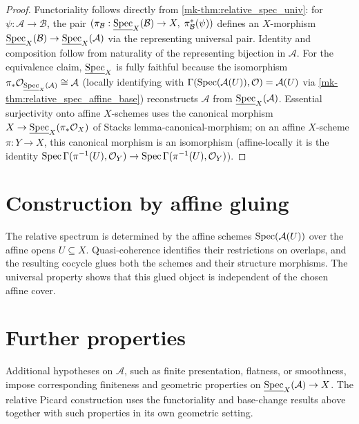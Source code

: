\begin{proof}
  Functoriality follows directly from \ref{mk-thm:relative_spec_univ}: for
  \(\psi : \mathcal{A} \to \mathcal{B}\), the pair
  \((\pi_{\mathcal{B}} : \underline{\operatorname{Spec}}_X(\mathcal{B}) \to X, \;
  \pi_{\mathcal{B}}^*(\psi))\) defines an \(X\)-morphism
  \(\underline{\operatorname{Spec}}_X(\mathcal{B}) \to \underline{\operatorname{Spec}}_X(\mathcal{A})\) via the
  representing universal pair. Identity and composition follow from naturality of the
  representing bijection in \(\mathcal{A}\). For the equivalence claim, \(\underline{\operatorname{Spec}}_X\)
  is fully faithful because the isomorphism
  \(\pi_* \mathcal{O}_{\underline{\operatorname{Spec}}_X(\mathcal{A})} \cong \mathcal{A}\)
  (locally identifying with \(\Gamma(\operatorname{Spec}(\mathcal{A}(U)),\mathcal{O}) = \mathcal{A}(U)\)
  via \ref{mk-thm:relative_spec_affine_base}) reconstructs \(\mathcal{A}\) from
  \(\underline{\operatorname{Spec}}_X(\mathcal{A})\). Essential surjectivity onto affine \(X\)-schemes uses
  the canonical morphism \(X \to \underline{\operatorname{Spec}}_X(\pi_*\mathcal{O}_X)\) of Stacks
  lemma-canonical-morphism; on an affine \(X\)-scheme \(\pi : Y \to X\), this canonical
  morphism is an isomorphism (affine-locally it is the identity
  \(\operatorname{Spec}\Gamma(\pi^{-1}(U), \mathcal{O}_Y) \to \operatorname{Spec}\Gamma(\pi^{-1}(U), \mathcal{O}_Y)\)).
\end{proof}

\section{Construction by affine gluing}
The relative spectrum is determined by the affine schemes
\(\operatorname{Spec}(\mathcal{A}(U))\) over the affine opens \(U \subseteq X\). Quasi-coherence
identifies their restrictions on overlaps, and the resulting cocycle glues both the
schemes and their structure morphisms. The universal property shows that this glued
object is independent of the chosen affine cover.

\section{Further properties}
\label{mk-sec:relspec_out_of_scope}

Additional hypotheses on \(\mathcal{A}\), such as finite presentation, flatness, or
smoothness, impose corresponding finiteness and geometric properties on
\(\underline{\operatorname{Spec}}_X(\mathcal{A}) \to X\). The relative Picard construction uses the
functoriality and base-change results above together with such properties in its own
geometric setting.
